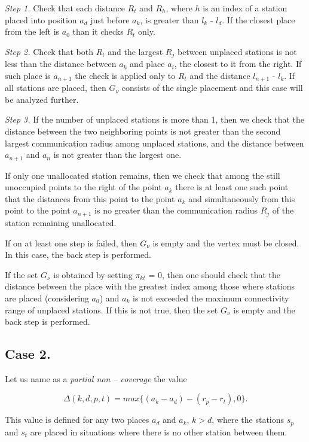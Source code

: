 \textit {Step 1.} Check that each distance $R_t$ and $R_h$, where $h$ is an index of a station placed into position $a_d$ just before $a_k$, is greater than $l_k$ - $l_d$. If the closest place from the left is $a_0$ than it checks $R_t$ only.

\textit {Step 2.} Check that both $R_t$ and the largest $R_j$ between unplaced stations is not less than the distance between $a_k$ and place $a_i$, the closest to it from the right. If such place is $a_{n+1}$ the check is applied only to $R_t$ and the distance $l_{n+1}$ - $l_k$.
If all stations are placed, then $G_\nu$ consists of the single placement and this case will be analyzed further.

\textit {Step 3.} If the number of unplaced stations is more than 1, then we check that the distance between the two neighboring points is not greater than the second largest communication radius among unplaced stations, and the distance between $a_{n+1}$ and $a_{n}$ is not greater than the largest one. 

If only one unallocated station remains, then we check that among the still unoccupied points to the right of the point $a_k$  there is at least one such point that the distances from this point to the point $a_k$ and simultaneously from this point to the point $a_{n+1}$ is no greater than the communication radius $R_j$ of the station remaining unallocated.

If on at least one step is failed, then $G_\nu$ is empty and the vertex must be closed. In this case, the back step is performed.

If the set $G_\nu$ is obtained by setting $\pi_{kt}$ = 0, then one should check that the distance between the place with the greatest index among those where stations are placed (considering $a_0$) and $a_k$ is not exceeded the maximum connectivity range of unplaced stations.  If this is not true, then the set $G_\nu$  is empty and the back step is performed.

\subsection{Case 2.}
Let us name as a \textit {partial non – coverage} the value

\begin{equation}\label{eq1}
\Delta(k,d,p,t) = max\{\left(a_{k} - a_{d} \right) - \left(r_{p} - r_{t} \right), 0\}.
\end{equation}

This value is defined for any two places $a_d$ and $a_k$, $k > d$, where the stations $s_p$ and $s_t$ are placed in situations  where  there is no other station between them.

